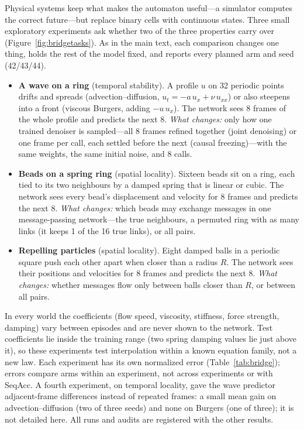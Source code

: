 \documentclass[11pt]{article}
\begin{document}
Physical systems keep what makes the automaton useful---a simulator computes the correct future---but replace binary cells with continuous states. Three small exploratory experiments ask whether two of the three properties carry over (Figure~\ref{fig:bridgetasks}). As in the main text, each comparison changes one thing, holds the rest of the model fixed, and reports every planned arm and seed (42/43/44).
\begin{itemize}
\item \textbf{A wave on a ring} (temporal stability). A profile $u$ on 32 periodic points drifts and spreads (advection--diffusion, $u_t=-a\,u_x+\nu\,u_{xx}$) or also steepens into a front (viscous Burgers, adding $-u\,u_x$). The network sees 8 frames of the whole profile and predicts the next 8. \emph{What changes:} only how one trained denoiser is sampled---all 8 frames refined together (joint denoising) or one frame per call, each settled before the next (causal freezing)---with the same weights, the same initial noise, and 8 calls.
\item \textbf{Beads on a spring ring} (spatial locality). Sixteen beads sit on a ring, each tied to its two neighbours by a damped spring that is linear or cubic. The network sees every bead's displacement and velocity for 8 frames and predicts the next 8. \emph{What changes:} which beads may exchange messages in one message-passing network---the true neighbours, a permuted ring with as many links (it keeps 1 of the 16 true links), or all pairs.
\item \textbf{Repelling particles} (spatial locality). Eight damped balls in a periodic square push each other apart when closer than a radius $R$. The network sees their positions and velocities for 8 frames and predicts the next 8. \emph{What changes:} whether messages flow only between balls closer than $R$, or between all pairs.
\end{itemize}
In every world the coefficients (flow speed, viscosity, stiffness, force strength, damping) vary between episodes and are never shown to the network. Test coefficients lie inside the training range (two spring damping values lie just above it), so these experiments test interpolation within a known equation family, not a new law. Each experiment has its own normalized error (Table~\ref{tab:bridge}); errors compare arms within an experiment, not across experiments or with SeqAcc. A fourth experiment, on temporal locality, gave the wave predictor adjacent-frame differences instead of repeated frames: a small mean gain on advection--diffusion (two of three seeds) and none on Burgers (one of three); it is not detailed here. All runs and audits are registered with the other results.
\end{document}
